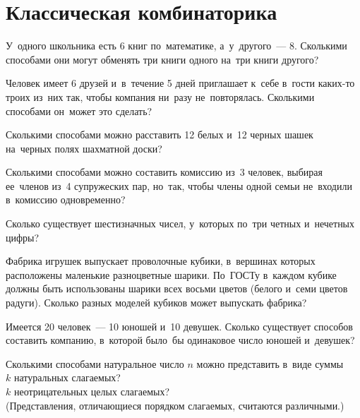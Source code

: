 
\section*{Классическая комбинаторика}


\begin{problems}

\item
У~одного школьника есть 6 книг по~математике, а~у~другого~--- 8. 
Сколькими способами они могут обменять три книги одного на~три книги другого?

\item
Человек имеет 6 друзей и~в~течение 5 дней приглашает к~себе в~гости каких-то
троих из~них так, чтобы компания ни~разу не~повторялась.
Сколькими способами он~может это сделать?

\item
Сколькими способами можно расставить 12 белых и~12 черных шашек на~черных полях
шахматной доски?

\item
Сколькими способами можно составить комиссию из~3 человек, выбирая ее~членов
из~4 супружеских пар, но~так, чтобы члены одной семьи не~входили в~комиссию
одновременно?

\item
Сколько существует шестизначных чисел, у~которых по~три четных и~нечетных
цифры?

\item
Фабрика игрушек выпускает проволочные кубики, в~вершинах которых расположены
маленькие разноцветные шарики.
По~ГОСТу в~каждом кубике должны быть использованы шарики всех восьми цветов
(белого и~семи цветов радуги).
Сколько разных моделей кубиков может выпускать фабрика?

\item
Имеется 20 человек~--- 10 юношей и~10 девушек.
Сколько существует способов составить компанию, в~которой было~бы одинаковое
число юношей и~девушек?

\item
Сколькими способами натуральное число $n$ можно представить в~виде суммы
\\
\subproblem $k$ натуральных слагаемых?
\\
\subproblem $k$ неотрицательных целых слагаемых?
\\
(Представления, отличающиеся порядком слагаемых, считаются различными.)

\end{problems}

